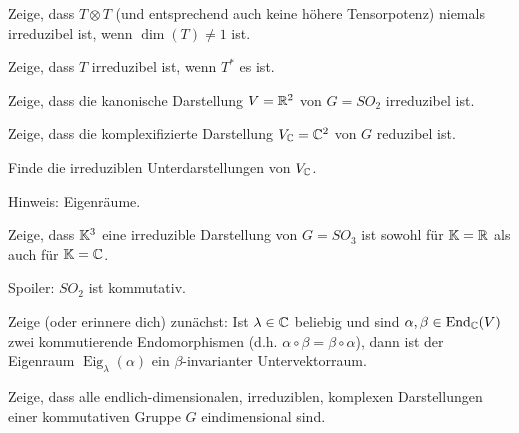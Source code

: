 \begin{sheet}
\begin{problem}[title={Reduzibilität von $T\otimes T$}]
Zeige, dass $T\otimes T$ (und entsprechend auch keine höhere Tensorpotenz) niemals irreduzibel ist, wenn $\dim(T) \neq 1$ ist.
\end{problem}

\begin{problem}[title={Irreduzibilität von $T^\ast\implies$ Irreduzibilität von $T$?}]
Zeige, dass $T$ irreduzibel ist, wenn $T^\ast$ es ist.
\end{problem}

\begin{problem}[title={Kanonische Darstellung von $SO_2$}]\label{ex:fundamentaldarstellung_von_so2}
\begin{subproblem}
Zeige, dass die kanonische Darstellung $V=\mathbb{R}^2$ von $G=SO_2$ irreduzibel ist.
\end{subproblem}
\begin{subproblem}
Zeige, dass die komplexifizierte Darstellung $V_{\mathbb{C}}=\mathbb{C}^2$ von $G$ reduzibel ist.
\end{subproblem}
\begin{subproblem}
Finde die irreduziblen Unterdarstellungen von $V_{\mathbb{C}}$.

Hinweis: Eigenräume.
\end{subproblem}
\end{problem}

\begin{problem}[title={Die kanonische Darstellung von $SO_3$ ist irreduzibel}]\label{ex:fundamentaldarstellung_von_so3}
Zeige, dass $\mathbb{K}^3$ eine irreduzible Darstellung von $G=SO_3$ ist sowohl für $\mathbb{K}=\mathbb{R}$ als auch für $\mathbb{K}=\mathbb{C}$.
\end{problem}

\begin{problem}[title={Was geht bei $SO_2$ schief?}]
Spoiler: $SO_2$ ist kommutativ.

\begin{subproblem}
Zeige (oder erinnere dich) zunächst: Ist $\lambda\in\mathbb{C}$ beliebig und sind $\alpha,\beta\in\operatorname{End}_{\mathbb{C}}(V)$ zwei kommutierende Endomorphismen (d.h. $\alpha\circ\beta=\beta\circ\alpha$), dann ist der Eigenraum $\operatorname{Eig}_\lambda(\alpha)$ ein $\beta$-invarianter Untervektorraum.
\end{subproblem}
\begin{subproblem}
Zeige, dass alle endlich-dimensionalen, irreduziblen, komplexen Darstellungen einer kommutativen Gruppe $G$ eindimensional sind.
\end{subproblem}
\end{problem}


\end{sheet}
